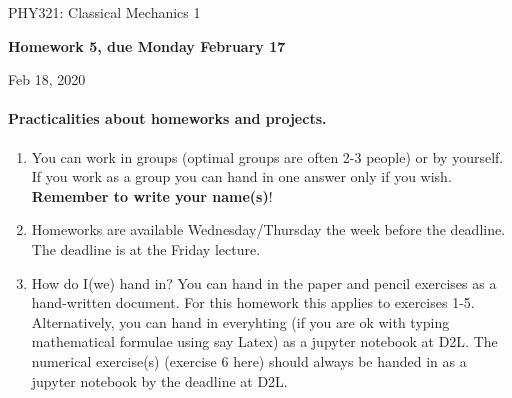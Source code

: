 \documentclass[%
oneside,                 %
final,                   %
10pt]{article}
\begin{document}

\newcommand{\exercisesection}[1]{\subsection*{#1}}






\thispagestyle{empty}

\begin{center}
{\LARGE\bf
\begin{spacing}{1.25}
PHY321: Classical Mechanics 1
\end{spacing}
}
\end{center}


\begin{center}
{\bf Homework 5, due Monday  February 17${}^{}$} \\ [0mm]
\end{center}

\begin{center}
\end{center}
    

\begin{center}
Feb 18, 2020
\end{center}

\vspace{1cm}


\paragraph{Practicalities about  homeworks and projects.}
\begin{enumerate}
\item You can work in groups (optimal groups are often 2-3 people) or by yourself. If you work as a group you can hand in one answer only if you wish. \textbf{Remember to write your name(s)}!

\item Homeworks are available Wednesday/Thursday the week before the deadline. The deadline is at the Friday lecture.

\item How do I(we)  hand in?  You can hand in the paper and pencil exercises as a hand-written document. For this homework this applies to exercises 1-5. Alternatively, you can hand in everyhting (if you are ok with typing mathematical formulae using say Latex) as a jupyter notebook at D2L. The numerical exercise(s) (exercise 6 here) should always be handed in as a jupyter notebook by the deadline at D2L. 
\end{enumerate}
\end{document}
